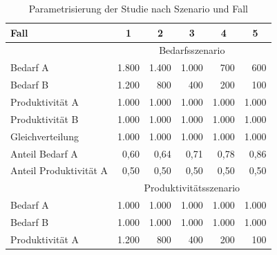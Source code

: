 \documentclass[justified,nobib,symmetric,twoside]{tufte-handout}
\begin{document}
\begin{table}[t]\label{tab:faelle}
   \caption{Parametrisierung der Studie nach Szenario und Fall}
   \begin{center}
   \begin{tabular}{lrrrrr}
   \hline
   Fall                   & \multicolumn{1}{c}{1} & \multicolumn{1}{c}{2} & \multicolumn{1}{c}{3} & \multicolumn{1}{c}{4} & \multicolumn{1}{c}{5} \\
   \hline\hline
                          & \multicolumn{5}{c}{Bedarfsszenario}                                                                                   \\
   \hline
   Bedarf A               & 1.800                 & 1.400                 & 1.000                 & 700                   & 600                   \\
   Bedarf B               & 1.200                 & 800                   & 400                   & 200                   & 100                   \\
   Produktivität A        & 1.000                 & 1.000                 & 1.000                 & 1.000                 & 1.000                 \\
   Produktivität B        & 1.000                 & 1.000                 & 1.000                 & 1.000                 & 1.000                 \\
   Gleichverteilung       & 1.000                 & 1.000                 & 1.000                 & 1.000                 & 1.000                 \\
   Anteil Bedarf A        & 0,60                  & 0,64                  & 0,71                  & 0,78                  & 0,86                  \\
   Anteil Produktivität A & 0,50                  & 0,50                  & 0,50                  & 0,50                  & 0,50                  \\
   \hline
                          & \multicolumn{5}{c}{Produktivitätsszenario}                                                                            \\
   \hline
   Bedarf A               & 1.000                 & 1.000                 & 1.000                 & 1.000                 & 1.000                 \\
   Bedarf B               & 1.000                 & 1.000                 & 1.000                 & 1.000                 & 1.000                 \\
   Produktivität A        & 1.200                 & 800                   & 400                   & 200                   & 100                   \\

\end{tabular}
\end{center}
\end{table}
\end{document}
